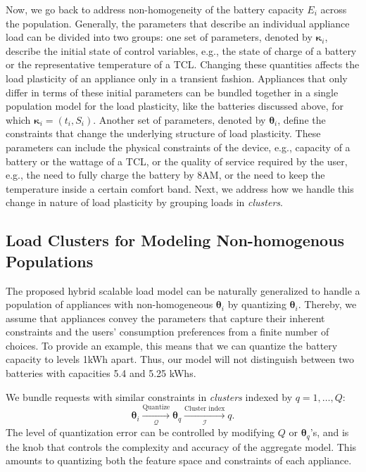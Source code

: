 \documentclass[10pt]{IEEEtran}
\begin{document}
Now, we go back to address non-homogeneity of the battery capacity $E_i$ across the population. Generally, the parameters that describe an individual appliance load can be divided into two groups: one set of parameters, denoted by $\boldsymbol{\kappa}_i$, describe the initial state of  control variables, e.g., the state of charge of a battery or the representative temperature of a TCL. Changing these quantities affects the load plasticity of an appliance only in a transient fashion. Appliances that only differ in terms of these initial parameters can be bundled together in a single population model for the load plasticity, like the batteries discussed above, for which $\boldsymbol{\kappa}_i = (t_i,S_i)$. Another set of parameters, denoted by $\boldsymbol{\theta}_i$, define the constraints that change the underlying structure of load plasticity. These parameters can include the physical constraints of the device, e.g., capacity of a battery or the wattage of a TCL, or the quality of service required by the user, e.g., the need to fully charge the battery by 8AM, or the need to keep the temperature inside a certain comfort band. Next, we address how we handle this change in nature of load plasticity by grouping loads in {\it clusters}.



\subsection{Load Clusters for Modeling Non-homogenous Populations}\label{cluster.sec}


The  proposed  hybrid scalable load model  can be naturally generalized to handle a population of appliances with non-homogeneous $\boldsymbol{\theta}_i$  by quantizing $\boldsymbol{\theta}_i$. Thereby, we assume that appliances convey the parameters that capture their inherent constraints and the users' consumption preferences from a finite number of choices. To provide an example, this means that we can quantize the battery capacity to levels 1kWh apart. Thus, our model will not distinguish between two batteries with capacities 5.4 and 5.25 kWhs.

 We bundle requests with similar constraints in {\it clusters} indexed by $q=1, \ldots, Q$:
\begin{equation}
\boldsymbol{\theta}_i \xrightarrow[\mathcal{Q}]{\mbox{Quantize}} \boldsymbol{\theta}_q \xrightarrow[\mathcal{I}] {\mbox{Cluster index}} q.
\end{equation} 
The level of quantization error can be controlled by modifying $Q$ or $\boldsymbol{\theta}_q$'s, and is the knob that controls the complexity and accuracy of the aggregate model. This amounts to quantizing both the feature space and constraints of each appliance. 
\end{document}
